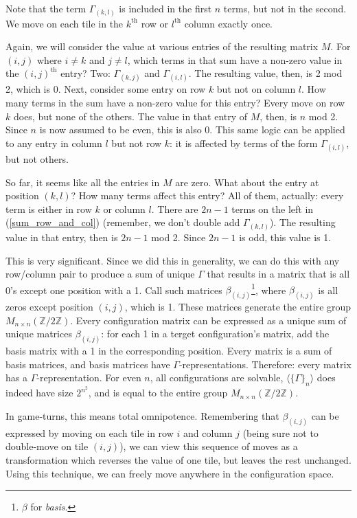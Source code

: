 \documentclass{article}[12pt]
\newcommand{\supt}[1]{^{\text{#1}}}
\newcommand{\gen}[2]{\Gamma_{(#1,#2)}}
\newcommand{\basis}[2]{\beta_{(#1,#2)}}
\newcommand{\group}[1]{M_{#1 \times #1}(\mathbb{Z}/2\mathbb{Z})}
\newcommand{\subgroup}[1]{\langle\{\Gamma\}_{#1}\rangle}
\newcommand{\refx}[1]{(\ref{#1})}
\begin{document}
Note that the term $\gen{k}{l}$ is included in the first $n$ terms, but not in the second.  We move on each tile in the $k\supt{th}$ row or $l\supt{th}$ column exactly once.

Again, we will consider the value at various entries of the resulting matrix $M$.  For $(i,j)$ where $i \neq k$ and $j \neq l$, which terms in that sum have a non-zero value in the $(i,j)\supt{th}$ entry?  Two: $\gen{k}{j}$ and $\gen{i}{l}$.  The resulting value, then, is 2 mod 2, which is 0.  Next, consider some entry on row $k$ but not on column $l$.  How many terms in the sum have a non-zero value for this entry?  Every move on row $k$ does, but none of the others.  The value in that entry of $M$, then, is $n$ mod 2.  Since $n$ is now assumed to be even, this is also 0.  This same logic can be applied to any entry in column $l$ but not row $k$: it is affected by terms of the form $\gen{i}{l}$, but not others.

So far, it seems like all the entries in $M$ are zero.  What about the entry at position $(k,l)$?  How many terms affect this entry?  All of them, actually: every term is either in row $k$ or column $l$.  There are $2n - 1$ terms on the left in \refx{sum_row_and_col} (remember, we don't double add $\gen{k}{l}$).  The resulting value in that entry, then is $2n - 1$ mod 2.  Since $2n - 1$ is odd, this value is 1.

This is very significant.  Since we did this in generality, we can do this with any row/column pair to produce a sum of unique $\Gamma$ that results in a matrix that is all 0's except one position with a 1.  Call such matrices $\basis{i}{j}$\footnote{$\beta$ for \emph{basis}.}, where $\basis{i}{j}$ is all zeros except position $(i,j)$, which is 1.  These matrices generate the entire group $\group{n}$.  Every configuration matrix can be expressed as a unique sum of unique matrices $\basis{i}{j}$: for each 1 in a terget configuration's matrix, add the basis matrix with a 1 in the corresponding position.  Every matrix is a sum of basis matrices, and basis matrices have $\Gamma$-representations.  Therefore: every matrix has a $\Gamma$-representation.  For even $n$, all configurations are solvable, $\subgroup{n}$ does indeed have size $2^{n^2}$, and is equal to the entire group $\group{n}$.

In game-turns, this means total omnipotence.  Remembering that $\basis{i}{j}$ can be expressed by moving on each tile in row $i$ and column $j$ (being sure not to double-move on tile $(i,j)$), we can view this sequence of moves as a transformation which reverses the value of one tile, but leaves the rest unchanged.  Using this technique, we can freely move anywhere in the configuration space.
\end{document}
